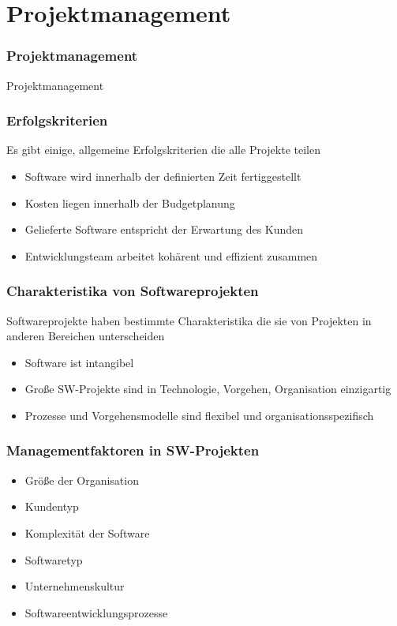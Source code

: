 \section{Projektmanagement}
\begin{frame}[fragile]
	\frametitle{Projektmanagement}
\huge Projektmanagement
\end{frame}

\begin{frame}
\frametitle{Erfolgskriterien}
	Es gibt einige, allgemeine Erfolgskriterien die alle Projekte teilen
	\begin{itemize}
		\item Software wird innerhalb der definierten Zeit fertiggestellt
		\item Kosten liegen innerhalb der Budgetplanung
		\item Gelieferte Software entspricht der Erwartung des Kunden
		\item Entwicklungsteam arbeitet kohärent und effizient zusammen
	\end{itemize}
\end{frame}

\begin{frame}
\frametitle{Charakteristika von Softwareprojekten}
	Softwareprojekte haben bestimmte Charakteristika die sie von Projekten
	in anderen Bereichen unterscheiden
	\begin{itemize}
		\item Software ist intangibel
		\item Große SW-Projekte sind in Technologie, Vorgehen, Organisation
		einzigartig
		\item Prozesse und Vorgehensmodelle sind flexibel und organisationsspezifisch
	\end{itemize}
\end{frame}

\begin{frame}
\frametitle{Managementfaktoren in SW-Projekten}
	\begin{itemize}
		\item Größe der Organisation
		\item Kundentyp
		\item Komplexität der Software
		\item Softwaretyp
		\item Unternehmenskultur
		\item Softwareentwicklungsprozesse
	\end{itemize}
\end{frame}

